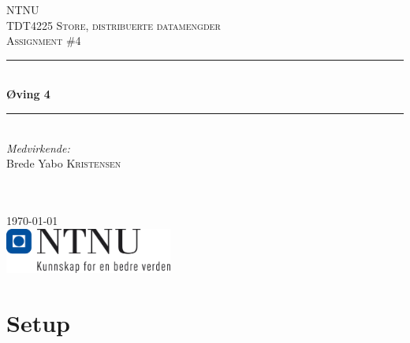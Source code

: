 \documentclass[12pt]{article}
\begin{document}
\begin{titlepage}

\newcommand{\HRule}{\rule{\linewidth}{0.5mm}} %

\center %
 

\textsc{\LARGE NTNU}\\[1.5cm] %
\textsc{\Large TDT4225 Store, distribuerte datamengder}\\[0.5cm] %
\textsc{\large Assignment \#4}\\[0.5cm] %

\HRule \\[0.4cm]
{ \huge \bfseries Øving 4}\\[0.4cm] %
\HRule \\[1.5cm]
 

\emph{Medvirkende:}\\
Brede Yabo \textsc{Kristensen}\\ %

~

\emph{} \\


{\large \today}\\[2cm] %

\includegraphics[width=55mm,scale=1.0]{logo_ntnu_bokm.png}\\[1cm] %
 
\title{}
\vfill %


\end{titlepage}

\section{Setup}
\end{document}
